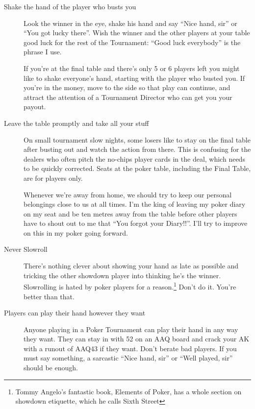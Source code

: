\begin{description}

\item[Shake the hand of the player who busts you] Look the winner in the
eye, shake his hand and say ``Nice hand, sir'' or ``You got lucky there''.
Wish the winner and the other players at your table good luck for the
rest of the Tournament: ``Good luck everybody'' is the phrase I use.

If you're at the final table and there's only 5 or 6 players left you
might like to shake everyone's hand, starting with the player who
busted you. If you're in the money, move to the side so that play
can continue, and attract the attention of a Tournament Director who
can get you your payout.

\item[Leave the table promptly and take all your stuff] On small
tournament slow nights, some losers like to stay on the final table
after busting out and watch the action from there. This is confusing
for the dealers who often pitch the no-chips player cards in the deal,
which needs to be quickly corrected. Seats at the poker table,
including the Final Table, are for players only.

Whenever we're away from home, we should try to keep our personal
belongings close to us at all times. I'm the king of leaving my poker
diary on my seat and be ten metres away from the table before other
players have to shout out to me that ``You forgot your Diary!!''. I'll
try to improve on this in my poker going forward.

\item[Never Slowroll]  There's nothing clever about showing your hand
as late as possible and tricking the other showdown player into thinking
he's the winner. Slowrolling is hated by poker players for a
reason.\footnote{Tommy Angelo's fantastic book, Elements of Poker, has
a whole section on showdown etiquette, which he calls Sixth Street}
Don't do it. You're better than that.


\item[Players can play their hand however they want] Anyone playing in
a Poker Tournament can play their hand in any way they want. They
can stay in with 52 on an AAQ board and crack your AK with a runout
of AAQ43 if they want. Don't berate bad players. If you must say
something, a sarcastic ``Nice hand, sir'' or ``Well played, sir'' should
be enough.


\end{description}
